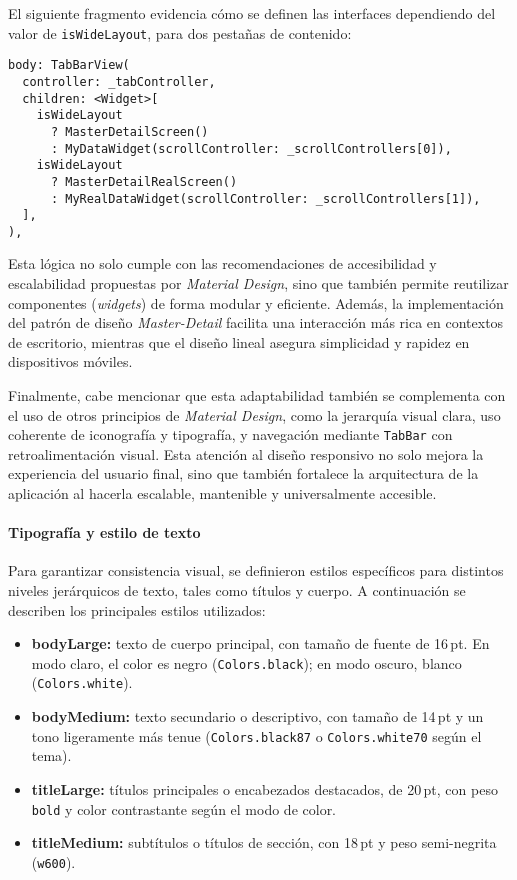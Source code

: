 El siguiente fragmento evidencia cómo se definen las interfaces dependiendo del valor de \texttt{isWideLayout}, para dos pestañas de contenido:

\begin{verbatim}
body: TabBarView(
  controller: _tabController,
  children: <Widget>[
    isWideLayout
      ? MasterDetailScreen()
      : MyDataWidget(scrollController: _scrollControllers[0]),
    isWideLayout
      ? MasterDetailRealScreen()
      : MyRealDataWidget(scrollController: _scrollControllers[1]),
  ],
),
\end{verbatim}

Esta lógica no solo cumple con las recomendaciones de accesibilidad y escalabilidad propuestas por \textit{Material Design}, sino que también permite reutilizar componentes (\textit{widgets}) de forma modular y eficiente. Además, la implementación del patrón de diseño \textit{Master-Detail} facilita una interacción más rica en contextos de escritorio, mientras que el diseño lineal asegura simplicidad y rapidez en dispositivos móviles.

Finalmente, cabe mencionar que esta adaptabilidad también se complementa con el uso de otros principios de \textit{Material Design}, como la jerarquía visual clara, uso coherente de iconografía y tipografía, y navegación mediante \texttt{TabBar} con retroalimentación visual. Esta atención al diseño responsivo no solo mejora la experiencia del usuario final, sino que también fortalece la arquitectura de la aplicación al hacerla escalable, mantenible y universalmente accesible.




\newpage
\paragraph{Tipografía y estilo de texto}

Para garantizar consistencia visual, se definieron estilos específicos para distintos niveles jerárquicos de texto, tales como títulos y cuerpo. A continuación se describen los principales estilos utilizados:

\begin{itemize}
  \item \textbf{bodyLarge:} texto de cuerpo principal, con tamaño de fuente de 16\,pt. En modo claro, el color es negro (\texttt{Colors.black}); en modo oscuro, blanco (\texttt{Colors.white}).
  \item \textbf{bodyMedium:} texto secundario o descriptivo, con tamaño de 14\,pt y un tono ligeramente más tenue (\texttt{Colors.black87} o \texttt{Colors.white70} según el tema).
  \item \textbf{titleLarge:} títulos principales o encabezados destacados, de 20\,pt, con peso \texttt{bold} y color contrastante según el modo de color.
  \item \textbf{titleMedium:} subtítulos o títulos de sección, con 18\,pt y peso semi-negrita (\texttt{w600}).
\end{itemize}


